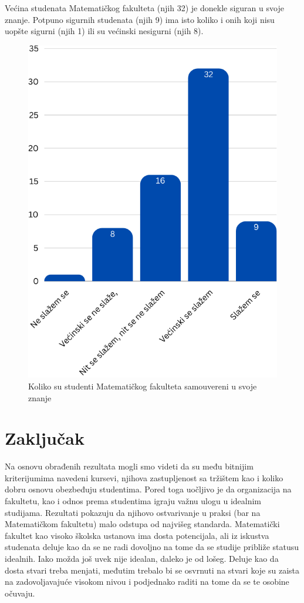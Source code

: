 \documentclass[a4paper]{article}
\begin{document}
{Većina studenata Matematičkog fakulteta (njih 32) je donekle siguran u svoje znanje. Potpuno sigurnih studenata (njih 9) ima isto koliko i onih koji nisu uopšte sigurni (njih 1) ili su većinski nesigurni (njih 8).
\begin{figure}[h!]
\begin{center}
    \includegraphics[scale = 0.3]{SamouverenostStudenataMatf.png}
    \caption{Koliko su studenti Matematičkog fakulteta samouvereni u svoje znanje}
    \label{fig:samouverenost_matf}
\end{center}
\end{figure}


\section{Zaključak}
\label{sec:zakljucak}

Na osnovu obrađenih rezultata mogli smo videti da su među bitnijim kriterijumima navedeni kursevi, njihova zastupljenost sa tržištem kao i koliko dobru osnovu obezbeđuju studentima. Pored toga uočljivo je da organizacija na fakultetu, kao i odnos prema studentima igraju važnu ulogu u idealnim studijama. Rezultati pokazuju da njihovo ostvarivanje u praksi (bar na Matematičkom fakultetu) malo odstupa od najvišeg standarda. Matematički fakultet kao visoko školska ustanova ima dosta potencijala, ali iz iskustva studenata deluje kao da se ne radi dovoljno na tome da se studije približe statusu idealnih. Iako možda još uvek nije idealan, daleko je od lošeg. Deluje kao da dosta stvari treba menjati, međutim trebalo bi se osvrnuti na stvari koje su zaista na zadovoljavajuće visokom nivou i podjednako raditi na tome da se te osobine očuvaju.  


}
\end{document}
